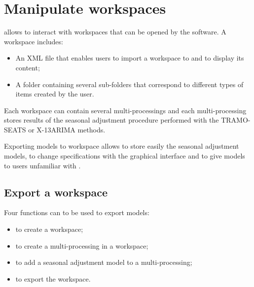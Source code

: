 \documentclass[article]{jss}
\providecommand{\tightlist}{%
  \setlength{\itemsep}{0pt}\setlength{\parskip}{0pt}}
\begin{document}
\hypertarget{manipulate-workspace}{%
\section[Manipulate JDemetra+ workspaces]{Manipulate  workspaces}\label{manipulate-workspace}}

 allows to interact with  workspaces
that can be opened by the software. A workspace includes:

\begin{itemize}
\tightlist
\item
  An XML file that enables users to import a workspace to
   and to display its content;\\
\item
  A folder containing several sub-folders that correspond to different
  types of items created by the user.
\end{itemize}

Each workspace can contain several multi-processings and each
multi-processing stores results of the seasonal adjustment procedure
performed with the TRAMO-SEATS or X-13ARIMA methods.

Exporting models to workspace allows to store easily the seasonal
adjustment models, to change specifications with the
 graphical interface and to give models to users
unfamiliar with .

\hypertarget{export-wk}{%
\subsection{Export a workspace}\label{export-wk}}

Four functions can to be used to export models:

\begin{itemize}
\tightlist
\item
   to create a workspace;\\
\item
   to create a multi-processing in a
  workspace;\\
\item
   to add a seasonal adjustment model to a
  multi-processing;\\
\item
   to export the workspace.
\end{itemize}
\end{document}
